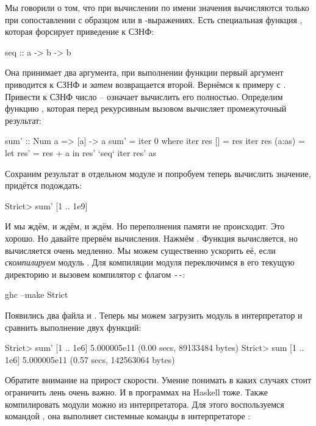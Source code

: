 Мы говорили о том, что при вычислении по имени значения вычисляются 
только при сопоставлении с образцом или в -выражениях. 
Есть специальная функция , которая форсирует приведение к СЗНФ:

\begin{code}
seq :: a -> b -> b
\end{code}

Она принимает два аргумента, при выполнении функции первый
аргумент приводится к СЗНФ и \emph{затем} возвращается второй.
Вернёмся к примеру с . Привести к СЗНФ число -- означает
вычислить его полностью. Определим функцию , которая 
перед рекурсивным вызовом вычисляет промежуточный результат:

\begin{code}
sum' :: Num a => [a] -> a
sum' = iter 0 
    where iter res []        = res
          iter res (a:as)    = let res' = res + a
                               in  res' `seq` iter res' as 
\end{code}

Сохраним результат в отдельном модуле  и
попробуем теперь вычислить значение, придётся подождать:

\begin{code}
Strict> sum' [1 .. 1e9]
\end{code}

И мы ждём, и ждём, и ждём. Но переполнения памяти не происходит.
Это хорошо. Но давайте прервём вычисления. Нажмём .
Функция  вычисляется, но вычисляется очень медленно.
Мы можем существенно ускорить её, если \emph{скомпилируем}
модуль .  Для компиляции модуля переключимся
в его текущую директорию и вызовем компилятор  с
флагом  \verb!--!:

\begin{code}
ghc --make Strict
\end{code}

Появились два файла  и . 
Теперь мы можем загрузить модуль  в 
интерпретатор и сравнить выполнение двух функций:

\begin{code}
Strict> sum' [1 .. 1e6]
5.000005e11
(0.00 secs, 89133484 bytes)
Strict> sum [1 .. 1e6]
5.000005e11
(0.57 secs, 142563064 bytes)
\end{code}

Обратите внимание на прирост скорости. Умение понимать
в каких случаях стоит ограничить лень очень важно. 
И в программах на Haskell тоже. 
Также компилировать модули можно из интерпретатора.
Для этого воспользуемся командой \In{:!}, она 
выполняет системные команды в интерпретаторе :

